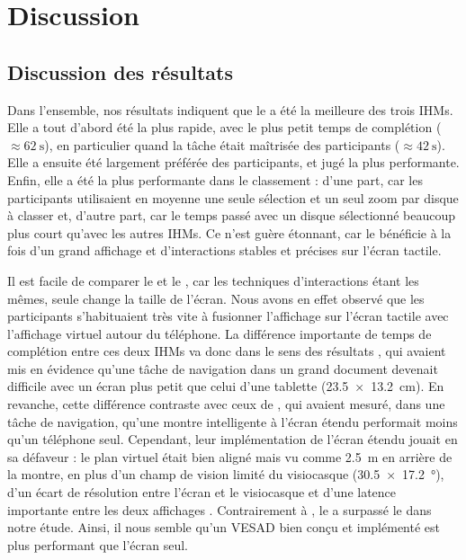\chapter{Discussion}
\label{ch:discussion}

\section{Discussion des résultats}
\label{sec:discussion_results}

Dans l'ensemble, nos résultats indiquent que le  a été la meilleure des trois IHMs. Elle a tout d'abord été la plus rapide, avec le plus petit temps de complétion ($\approx \SI{62}{\s}$), en particulier quand la tâche était maîtrisée des participants ($\approx \SI{42}{\s}$). Elle a ensuite été largement préférée des participants, et jugé la plus performante. Enfin, elle a été la plus performante dans le classement : d'une part, car les participants utilisaient en moyenne une seule sélection et un seul zoom par disque à classer et, d'autre part, car le temps passé avec un disque sélectionné beaucoup plus court qu'avec les autres IHMs. Ce n'est guère étonnant, car le  bénéficie à la fois d'un grand affichage et d'interactions stables et précises sur l'écran tactile.

Il est facile de comparer le  et le , car les techniques d'interactions étant les mêmes, seule change la taille de l'écran. Nous avons en effet observé que les participants s'habituaient très vite à fusionner l'affichage sur l'écran tactile avec l'affichage virtuel autour du téléphone. La différence importante de temps de complétion entre ces deux IHMs va donc dans le sens des résultats \cite{Raedle2014}, qui avaient mis en évidence qu'une tâche de navigation dans un grand document devenait difficile avec un écran plus petit que celui d'une tablette (\SI{23.5x13.2}{\cm}). En revanche, cette différence contraste avec ceux de \cite{Grubert2015}, qui avaient mesuré, dans une tâche de navigation, qu'une montre intelligente à l'écran étendu performait moins qu'un téléphone seul. Cependant, leur implémentation de l'écran étendu jouait en sa défaveur : le plan virtuel était bien aligné mais vu comme \SI{2.5}{\m} en arrière de la montre, en plus d'un champ de vision limité du visiocasque (\SI{30.5x17.2}{\degree}), d'un écart de résolution entre l'écran et le visiocasque et d'une latence importante entre les deux affichages . Contrairement à \citeauthor{Grubert2015}, le  a surpassé le  dans notre étude. Ainsi, il nous semble qu'un VESAD bien conçu et implémenté est plus performant que l'écran seul.

